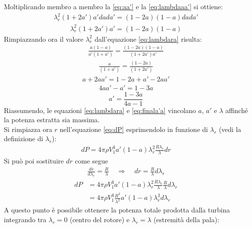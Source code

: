 Moltiplicando membro a membro la \ref{eq:aa'} e la \ref{eq:lambdaaa'} si ottiene:
\begin{align*}
\lambda_r^2 \left( 1 + 2a' \right) a' da da' = \left( 1 - 2a \right) \left( 1-a \right) da da'
\end{align*}
\begin{align*}
\lambda_r^2 \left( 1 + 2a' \right) a' = \left( 1- 2a \right) \left(1 -a \right)
\end{align*}
Rimpiazzando ora il valore $\lambda_r^2$ dall'equazione \ref{eq:lambdara} risulta:
\begin{align*}
\frac{a \left(1 - a \right)}{a' \left(1 + a' \right)} = \frac{\left( 1 - 2a \right) \left( 1 -a \right)}{\left(1 + 2a' \right) a'}
\end{align*}
\begin{align*}
\frac{a}{\left( 1 + a' \right)} = \frac{\left( 1 - 2a \right)}{\left( 1 + 2a' \right)}
\end{align*}
\begin{align*}
a + 2 a a' = 1 - 2a + a' - 2aa'
\end{align*}
\begin{align*}
4aa' -a' = 1 - 3a
\end{align*}
\begin{equation}\label{eq:finala'a}
a' = \frac{1 - 3a}{4a -1}
\end{equation}
Riassumendo, le equazioni \ref{eq:lambdara} e \ref{eq:finala'a} vincolano $a$, $a'$ e $\lambda$ affinché la potenza estratta sia massima.\\
Si rimpiazza ora $r$ nell'equazione \ref{eq:dP} esprimendolo in funzione di $\lambda_r$ (vedi la definizione di $\lambda_r$):
\begin{align*}
dP = 4 \pi \rho V_1^3 a' \left( 1 - a \right) \lambda_r^2 \frac{R \lambda_r}{\lambda} dr
\end{align*}
Si può poi sostituire $dr$ come segue
\begin{align*}
\frac{dr}{d \lambda_r} = \frac{R}{\lambda} \;\;\;\; \Rightarrow \;\;\;\; dr = \frac{R}{\lambda} d \lambda_r
\end{align*}
\begin{align*}
dP &= 4 \pi \rho V_1^3 a' \left(1 - a \right) \lambda_r^2 \frac{R \lambda_r}{\lambda} \frac{R}{\lambda} d \lambda_r\\
&= 4 \pi \rho V_1^3 \frac{R^2}{\lambda^2} a' \left( 1 - a \right) \lambda_r^3 d\lambda_r
\end{align*}
A questo punto è possibile ottenere la potenza totale prodotta dalla turbina integrando tra $\lambda_r = 0$ (centro del rotore) e $\lambda_r = \lambda$ (estremità della pala):
